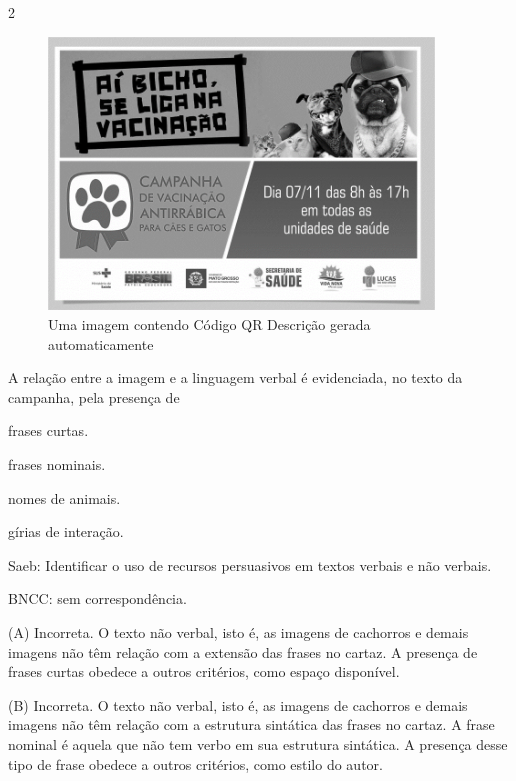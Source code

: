 \num{2}

\begin{figure}
\centering
\includegraphics[width=4.03125in,height=2.85231in]{./imgSAEB_8_POR/media/image28.png}
\caption{Uma imagem contendo Código QR Descrição gerada automaticamente}
\end{figure}


A relação entre a imagem e a linguagem verbal é evidenciada, no texto da
campanha, pela presença de

\begin{escolha}
\item frases curtas.

\item frases nominais.

\item nomes de animais.

\item gírias de interação.
\end{escolha}

Saeb: Identificar o uso de recursos persuasivos em textos verbais e não
verbais.

BNCC: sem correspondência.

(A) Incorreta. O texto não verbal, isto é, as imagens de cachorros e
demais imagens não têm relação com a extensão das frases no cartaz. A
presença de frases curtas obedece a outros critérios, como espaço
disponível.

(B) Incorreta. O texto não verbal, isto é, as imagens de cachorros e
demais imagens não têm relação com a estrutura sintática das frases no
cartaz. A frase nominal é aquela que não tem verbo em sua estrutura
sintática. A presença desse tipo de frase obedece a outros critérios,
como estilo do autor.


